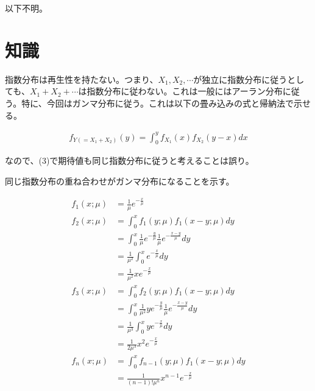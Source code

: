 \documentclass[a4paper, 10pt, dvipdfmx]{jlreq}
\begin{document}
以下不明。

\section{知識}

指数分布は再生性を持たない。つまり、$X_1,X_2,\cdots$が独立に指数分布に従うとしても、$X_1+X_2+\cdots$は指数分布に従わない。これは一般にはアーラン分布に従う。特に、今回はガンマ分布に従う。これは以下の畳み込みの式と帰納法で示せる。

\begin{align*}
    f_{Y(=X_1+X_2)}(y)=\int_0^{y}{f_{X_1}(x)f_{X_2}(y-x)dx}
\end{align*}

なので、(3)で期待値も同じ指数分布に従うと考えることは誤り。

同じ指数分布の重ね合わせがガンマ分布になることを示す。

\begin{align*}
    f_1(x;\mu) & =\frac{1}{\mu}e^{-\frac{x}{\mu}}                                                 \\
    f_2(x;\mu) & =\int_0^x{f_1(y;\mu)f_1(x-y;\mu)dy}                                              \\
               & =\int_0^x{\frac{1}{\mu}e^{-\frac{y}{\mu}}\frac{1}{\mu}e^{-\frac{x-y}{\mu}}dy}    \\
               & =\frac{1}{\mu^2}\int_0^x{e^{-\frac{x}{\mu}}dy}                                   \\
               & =\frac{1}{\mu^2}xe^{-\frac{x}{\mu}}                                              \\
    f_3(x;\mu) & =\int_0^x{f_2(y;\mu)f_1(x-y;\mu)dy}                                              \\
               & =\int_0^x{\frac{1}{\mu^2}ye^{-\frac{y}{\mu}}\frac{1}{\mu}e^{-\frac{x-y}{\mu}}dy} \\
               & =\frac{1}{\mu^3}\int_0^x{ye^{-\frac{x}{\mu}}dy}                                  \\
               & =\frac{1}{2\mu^3}x^2e^{-\frac{x}{\mu}}                                           \\
    f_n(x;\mu) & =\int_0^x{f_{n-1}(y;\mu)f_1(x-y;\mu)dy}                                          \\
               & =\frac{1}{(n-1)!\mu^n} x^{n-1} e^{-\frac{x}{\mu}}                                \\
\end{align*}
\end{document}
